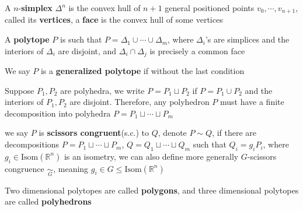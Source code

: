 \documentclass[../main.tex]{subfiles}
\begin{document}
\begin{definition}
A $n$-\textbf{simplex} $\Delta^n$ is the convex hull of $n+1$ general positioned points $v_0,\cdots,v_{n+1}$, called its \textbf{vertices}, a \textbf{face} is the convex hull of some vertices
\end{definition}

\begin{definition}\label{Scissors conguence}
A \textbf{polytope} $P$ is such that $P=\Delta_1\cup\cdots\cup \Delta_m$, where $\Delta_i$'s are simplices and the interiors of $\Delta_i$ are disjoint, and $\Delta_i\cap\Delta_j$ is precisely a common face \par
We say $P$ is a \textbf{generalized polytope} if without the last condition
\begin{center}
\end{center}
Suppose $P_1,P_2$ are polyhedra, we write $P=P_1\sqcup P_2$ if $P=P_1\cup P_2$ and the interiors of $P_1,P_2$ are disjoint. Therefore, any polyhedron $P$ must have a finite decomposition into polyhedra $P=P_1\sqcup\cdots\sqcup P_m$ \par
we say $P$ is \textbf{scissors congruent}(s.c.) to $Q$, denote $P\sim Q$, if there are decompositions $P=P_1\sqcup\cdots\sqcup P_m$, $Q=Q_1\sqcup\cdots\sqcup Q_m$ such that $Q_i=g_iP_i$, where $g_i\in \mathrm{Isom}(\mathbb R^n)$ is an isometry, we can also define more generally $G$-scissors congruence $\underset{G}{\sim}$, meaning $g_i\in G\leq \mathrm{Isom}(\mathbb R^n)$
\end{definition}

\begin{remark}
Two dimensional polytopes are called \textbf{polygons}, and three dimensional polytopes are called \textbf{polyhedrons}
\end{remark}
\end{document}
